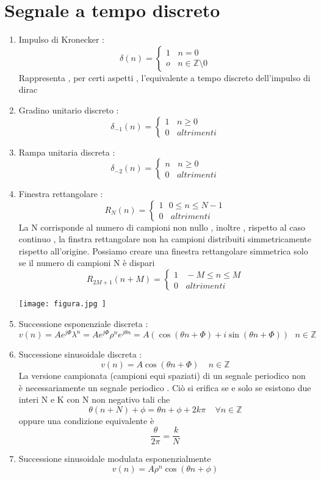 \documentclass{article}
\theoremstyle{definition}
\newcommand{\la}{\lambda}
\begin{document}
\section{Segnale a tempo discreto}
\begin{enumerate}
	\item Impulso di Kronecker : \\
	$$\delta(n)=\begin{cases}
		1 \ \ \ \  n=0 \\
		o \ \ \ \  n \in \mathbb{Z}\setminus 0
	\end{cases}$$ 
	 Rappresenta , per certi aspetti , l'equivalente a tempo discreto dell'impulso di dirac 
	\item Gradino unitario discreto :\\
	$$\delta_{-1}(n)=\begin{cases}
		1 \ \ \ \ n \geq 0 \\
		0 \ \ \ \ altrimenti
	\end{cases}$$
	\item Rampa unitaria discreta : 
	$$\delta_{-2}(n)=\begin{cases}
		n \ \ \ \ n \geq 0 \\
		0 \ \ \ \ altrimenti
	\end{cases}$$
	\item Finestra rettangolare : \\
	$$R_N(n)=\begin{cases}
		1 \ \ \ 0 \leq n \leq N-1\\
		0 \ \ \ \ altrimenti
	\end{cases}$$
	La N corrisponde al numero di campioni non nullo , inoltre , rispetto al caso continuo , la finstra rettangolare non ha campioni distribuiti simmetricamente rispetto all'origine. Possiamo creare una finestra rettangolare simmetrica solo se il numero di campioni N è dispari 
	$$R_{2M+1}(n+M)=\begin{cases}
	 1 \ \ \ \ -M \leq n \leq M \\
	 0 \ \ \ \ altrimenti 
	\end{cases}$$
	\begin{center}
		\texttt{[image: figura.jpg	]}
	\end{center}
	\item Successione esponenziale discreta : \\
	$$v(n)=Ae^{j\Phi}\la^n=A e^{j\Phi}\rho^n e^{j\theta n}=A(\cos(\theta n + \Phi)+i\sin(\theta n + \Phi)) \ \ \ n \in \mathbb{Z}$$
	\item Successione sinusoidale discreta : \\
	$$v(n)=A\cos(\theta n+\Phi) \ \ \ \ \ n \in \mathbb{Z}$$
	La versione campionata (campioni equi spaziati) di un segnale periodico non è necessariamente un segnale periodico . Ciò si erifica se e solo se esistono due interi N e K con N non negativo tali che 
	$$\theta(n+N)+\phi=\theta n + \phi + 2 k\pi  \ \ \ \ \ \forall n \in \mathbb{Z}$$ oppure una condizione equivalente è $$\frac{\theta}{2\pi}=\frac{k}{N}$$
	\item Successione sinusoidale modulata esponenzialmente \\ 
	$$v(n)=A\rho^n \cos(\theta n+\phi)$$
\end{enumerate}
\end{document}
